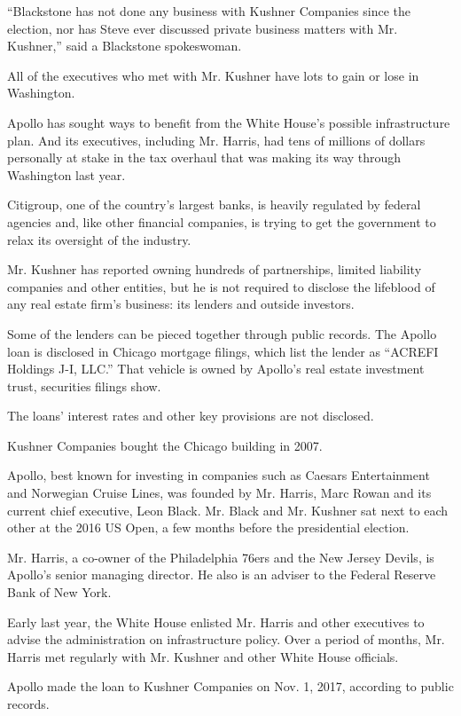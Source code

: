 ``Blackstone has not done any business with Kushner Companies since the
election, nor has Steve ever discussed private business matters with Mr.
Kushner,'' said a Blackstone spokeswoman.

All of the executives who met with Mr. Kushner have lots to gain or lose
in Washington.

Apollo has sought ways to benefit from the White House's possible
infrastructure plan. And its executives, including Mr. Harris, had tens
of millions of dollars personally at stake in the tax overhaul that was
making its way through Washington last year.

Citigroup, one of the country's largest banks, is heavily regulated by
federal agencies and, like other financial companies, is trying to get
the government to relax its oversight of the industry.

Mr. Kushner has reported owning hundreds of partnerships, limited
liability companies and other entities, but he is not required to
disclose the lifeblood of any real estate firm's business: its lenders
and outside investors.

Some of the lenders can be pieced together through public records. The
Apollo loan is disclosed in Chicago mortgage filings, which list the
lender as ``ACREFI Holdings J-I, LLC.'' That vehicle is owned by
Apollo's real estate investment trust, securities filings show.

The loans' interest rates and other key provisions are not disclosed.

Kushner Companies bought the Chicago building in 2007.

Apollo, best known for investing in companies such as Caesars
Entertainment and Norwegian Cruise Lines, was founded by Mr. Harris,
Marc Rowan and its current chief executive, Leon Black. Mr. Black and
Mr. Kushner sat next to each other at the 2016 US Open, a few months
before the presidential election.

Mr. Harris, a co-owner of the Philadelphia 76ers and the New Jersey
Devils, is Apollo's senior managing director. He also is an adviser to
the Federal Reserve Bank of New York.

Early last year, the White House enlisted Mr. Harris and other
executives to advise the administration on infrastructure policy. Over a
period of months, Mr. Harris met regularly with Mr. Kushner and other
White House officials.

Apollo made the loan to Kushner Companies on Nov. 1, 2017, according to
public records.


